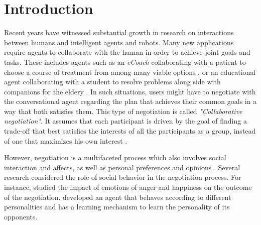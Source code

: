 \documentclass[conference, letterpaper]{IEEEtran}
\begin{document}
	\section{Introduction}
		Recent years have witnessed substantial growth in research on interactions between humans and intelligent agents and robots. Many new applications require agents to collaborate with the human in order to achieve joint goals and tasks. These includes agents such as an \textit{eCoach} collaborating with a patient to choose a course of treatment from among many viable options \cite{robertson2015visual}, or an educational agent collaborating with a student to resolve problems \cite{howard2017shifting} along side with companions for the eldery \cite{bickmore2005s}. In such situations, users might have to negotiate with the conversational agent regarding the plan that achieves their common goals in a way that both satisfies them. This type of negotiation is called \emph{"Collaborative negotiation"}. It assumes that each participant is driven by the goal of finding a trade-off that best satisfies the interests of all the participants as a group, instead of one that maximizes his own interest \cite{sidner1994artificial,chu1995response}.
	
	
		However, negotiation is a multifaceted process which also involves social interaction and affects, as well as personal preferences and opinions  \cite{bro2010affective}. Several research considered the role of social behavior in the negotiation process. For instance, \cite{de2011effect} studied the impact of emotions of anger and happiness on the outcome of the negotiation.  \cite{kraus1995designing} developed an agent that behaves according to different personalities and has a learning mechanism to learn the personality of its opponents. 
	
\end{document}
